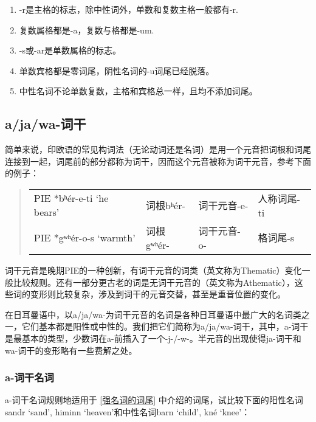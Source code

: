 \begin{info}
  \begin{enumerate}[1.]
    \item -r是主格的标志，除中性词外，单数和复数主格一般都有-r.
    \item 复数属格都是-a，复数与格都是-um.
    \item -s或-ar是单数属格的标志。
    \item 单数宾格都是零词尾，阴性名词的-u词尾已经脱落。
    \item 中性名词不论单数复数，主格和宾格总一样，且均不添加词尾。


  \end{enumerate}
\end{info}

\subsection{a/ja/wa-词干}
\label{a/ja/wa-词干}

简单来说，印欧语的常见构词法（无论动词还是名词）是用一个元音把词根和词尾连接到一起，词尾前的部分都称为词干，因而这个元音被称为词干元音，参考下面的例子：

\begin{quote}
  \begin{tabular}{llll}
    PIE *bʰér-e-ti `he bears' & 词根bʰér-  & 词干元音-e- & 人称词尾-ti \\
    PIE *gʷʰér-o-s `warmth'   & 词根gʷʰér- & 词干元音-o- & 格词尾-s
  \end{tabular}
\end{quote}

词干元音是晚期PIE的一种创新，有词干元音的词类（英文称为Thematic）变化一般比较规则。还有一部分更古老的词是无词干元音的（英文称为Athematic），这些词的变形则比较复杂，涉及到词干的元音交替，甚至是重音位置的变化。

在日耳曼语中，以a/ja/wa-为词干元音的名词是各种日耳曼语中最广大的名词类之一，它们基本都是阳性或中性的。我们把它们简称为a/ja/wa-词干，其中，a-词干是最基本的类型，少数词在a-前插入了一个-j-/-w-。半元音的出现使得ja-词干和wa-词干的变形略有一些费解之处。

\subsubsection{a-词干名词}

a-词干名词规则地适用于 \ref{强名词的词尾} 中介绍的词尾，试比较下面的阳性名词sandr
`sand', himinn `heaven'和中性名词barn `child', kné `knee'：

